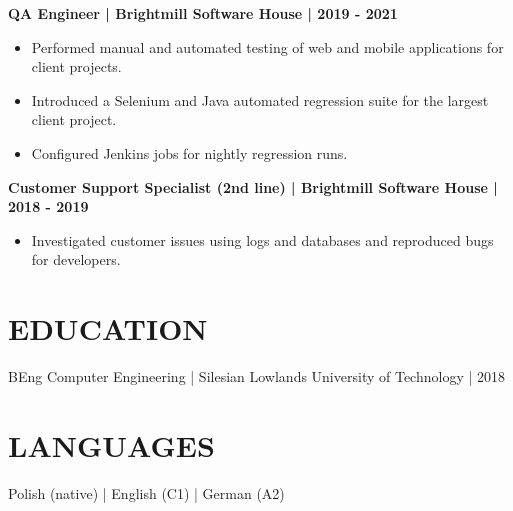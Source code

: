 \documentclass[11pt,a4paper]{article}
\newcommand{\cvsection}[1]{\section*{#1}}
\begin{document}
\textbf{QA Engineer | Brightmill Software House | 2019 - 2021}
\begin{itemize}
\item Performed manual and automated testing of web and mobile applications for client projects.
\item Introduced a Selenium and Java automated regression suite for the largest client project.
\item Configured Jenkins jobs for nightly regression runs.
\end{itemize}
\textbf{Customer Support Specialist (2nd line) | Brightmill Software House | 2018 - 2019}
\begin{itemize}
\item Investigated customer issues using logs and databases and reproduced bugs for developers.
\end{itemize}
\cvsection{EDUCATION}
BEng Computer Engineering | Silesian Lowlands University of Technology | 2018
\cvsection{LANGUAGES}
Polish (native) | English (C1) | German (A2)
\end{document}

